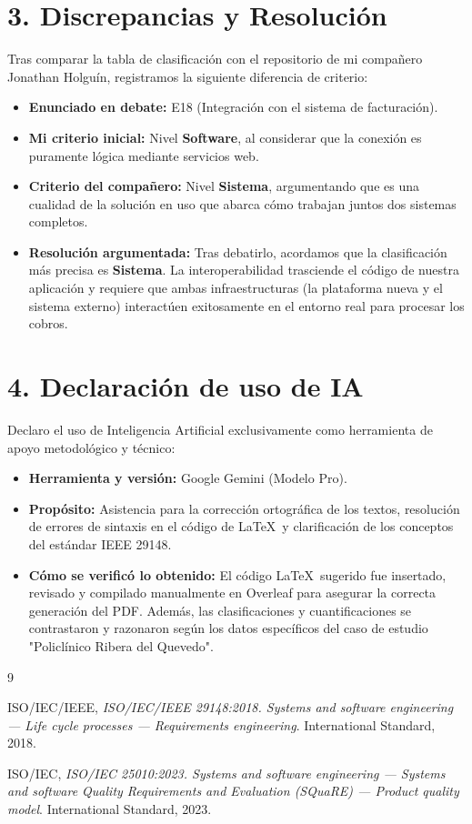 \documentclass[12pt,a4paper]{article}
\begin{document}
\section*{3. Discrepancias y Resolución}

Tras comparar la tabla de clasificación con el repositorio de mi compañero Jonathan Holguín, registramos la siguiente diferencia de criterio:

\begin{itemize}
    \item \textbf{Enunciado en debate:} E18 (Integración con el sistema de facturación).
    \item \textbf{Mi criterio inicial:} Nivel \textbf{Software}, al considerar que la conexión es puramente lógica mediante servicios web.
    \item \textbf{Criterio del compañero:} Nivel \textbf{Sistema}, argumentando que es una cualidad de la solución en uso que abarca cómo trabajan juntos dos sistemas completos.
    \item \textbf{Resolución argumentada:} Tras debatirlo, acordamos que la clasificación más precisa es \textbf{Sistema}. La interoperabilidad trasciende el código de nuestra aplicación y requiere que ambas infraestructuras (la plataforma nueva y el sistema externo) interactúen exitosamente en el entorno real para procesar los cobros.
\end{itemize}
\section*{4. Declaración de uso de IA}

Declaro el uso de Inteligencia Artificial exclusivamente como herramienta de apoyo metodológico y técnico:

\begin{itemize}
    \item \textbf{Herramienta y versión:} Google Gemini (Modelo Pro).
    \item \textbf{Propósito:} Asistencia para la corrección ortográfica de los textos, resolución de errores de sintaxis en el código de \LaTeX\ y clarificación de los conceptos del estándar IEEE 29148.
    \item \textbf{Cómo se verificó lo obtenido:} El código \LaTeX\ sugerido fue insertado, revisado y compilado manualmente en Overleaf para asegurar la correcta generación del PDF. Además, las clasificaciones y cuantificaciones se contrastaron y razonaron según los datos específicos del caso de estudio "Policlínico Ribera del Quevedo".
\end{itemize}

\renewcommand{\refname}{Referencias}
\begin{thebibliography}{9}

ISO/IEC/IEEE, \emph{ISO/IEC/IEEE 29148:2018. Systems and software engineering — Life cycle processes — Requirements engineering}. International Standard, 2018.

ISO/IEC, \emph{ISO/IEC 25010:2023. Systems and software engineering — Systems and software Quality Requirements and Evaluation (SQuaRE) — Product quality model}. International Standard, 2023.

\end{thebibliography}
\end{document}
